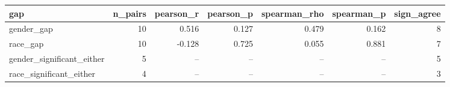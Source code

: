 \begin{tabular}{lrrrrrr}
\toprule
gap & n\_pairs & pearson\_r & pearson\_p & spearman\_rho & spearman\_p & sign\_agree \\
\midrule
gender\_gap & 10 & 0.516 & 0.127 & 0.479 & 0.162 & 8 \\
race\_gap & 10 & -0.128 & 0.725 & 0.055 & 0.881 & 7 \\
gender\_significant\_either & 5 & -- & -- & -- & -- & 5 \\
race\_significant\_either & 4 & -- & -- & -- & -- & 3 \\
\bottomrule
\end{tabular}

